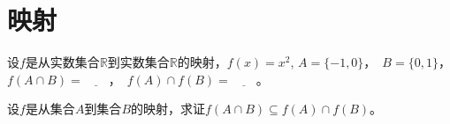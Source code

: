 \chapter{映射}
\begin{Ex}
设$f$是从实数集合$\mathbb{R}$到实数集合$\mathbb{R}$的映射，$f(x) = x^2$,
$A=\{-1,0\}$，　$B=\{0,1\}$，$f(A \cap B)=\underline{\quad\quad}$，　$f(A) \cap
f(B) = \underline{\quad\quad}$。
\end{Ex}

\begin{Ex}
设$f$是从集合$A$到集合$B$的映射，求证$f(A \cap B) \subseteq f(A) \cap f(B)$。
\end{Ex}
